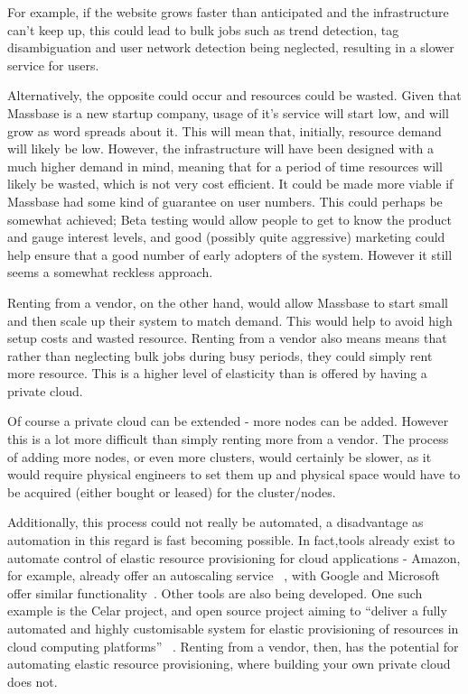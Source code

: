 \documentclass[12pt,a4paper]{article}
\begin{document}
For example, if the website grows faster than anticipated and the infrastructure can't keep up, this could lead to bulk jobs such as trend detection, tag disambiguation and user network detection being neglected, resulting in a slower service for users.

Alternatively, the opposite could occur and resources could be wasted. Given that Massbase is a new startup company, usage of it's service will start low, and will grow as word spreads about it. This will mean that, initially, resource demand will likely be low. However, the infrastructure will have been designed with a much higher demand in mind, meaning that for a period of time resources will likely be wasted, which is not very cost efficient. It could be made more viable if Massbase had some kind of guarantee on user numbers. This could perhaps be somewhat achieved; Beta testing would allow people to get to know the product and gauge interest levels, and good (possibly quite aggressive) marketing could help ensure that a good number of early adopters of the system. However it still seems a somewhat reckless approach.

Renting from a vendor, on the other hand, would allow Massbase to start small and then scale up their system to match demand. This would help to avoid high setup costs and wasted resource. Renting from a vendor also means means that rather than neglecting bulk jobs during busy periods, they could simply rent more resource. This is a higher level of elasticity than is offered by having a private cloud.

Of course a private cloud can be extended - more nodes can be added. However this is a lot more difficult than simply renting more from a vendor. The process of adding more nodes, or even more clusters, would certainly be slower, as it would require physical engineers to set them up and physical space would have to be acquired (either bought or leased) for the cluster/nodes.

Additionally, this process could not really be automated, a disadvantage as automation in this regard is fast becoming possible. In fact,tools already exist to automate control of elastic resource provisioning for cloud applications - Amazon, for example, already offer an autoscaling service ~\cite{am}, with Google and Microsoft offer similar functionality~\cite{nw}. Other tools are also being developed. One such example is the Celar project, and open source project aiming to ``deliver a fully automated and highly customisable system for elastic provisioning of resources in cloud computing platforms'' ~\cite{ce}. Renting from a vendor, then, has the potential for automating elastic resource provisioning, where building your own private cloud does not.
\end{document}
